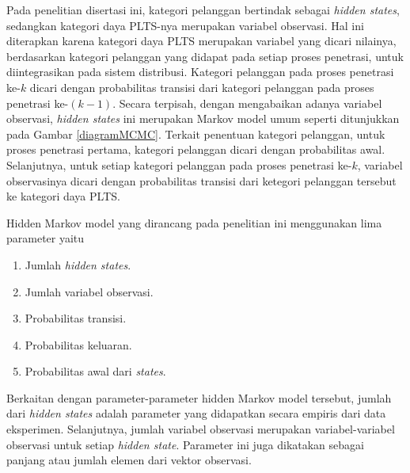 Pada penelitian disertasi ini, kategori pelanggan bertindak sebagai \textit{hidden states}, sedangkan kategori daya PLTS-nya merupakan variabel observasi. Hal ini diterapkan karena kategori daya PLTS merupakan variabel yang dicari nilainya, berdasarkan kategori pelanggan yang didapat pada setiap proses penetrasi, untuk diintegrasikan pada sistem distribusi. Kategori pelanggan pada proses penetrasi ke-$k$ dicari dengan probabilitas transisi dari kategori pelanggan pada proses penetrasi ke-$(k-1)$. Secara terpisah, dengan mengabaikan adanya variabel observasi, \textit{hidden states} ini merupakan Markov model umum seperti ditunjukkan pada Gambar \ref{diagramMCMC}. Terkait penentuan kategori pelanggan, untuk proses penetrasi pertama, kategori pelanggan dicari dengan probabilitas awal. Selanjutnya, untuk setiap kategori pelanggan pada proses penetrasi ke-$k$, variabel observasinya dicari dengan probabilitas transisi dari ketegori pelanggan tersebut ke kategori daya PLTS.

Hidden Markov model yang dirancang pada penelitian ini menggunakan lima parameter yaitu
\begin{enumerate}
	\item Jumlah \textit{hidden states}. 
	\item Jumlah variabel observasi. 
	\item Probabilitas transisi.
	\item Probabilitas keluaran.
	\item Probabilitas awal dari \textit{states}.
\end{enumerate}
Berkaitan dengan parameter-parameter hidden Markov model tersebut, jumlah dari \textit{hidden states} adalah parameter yang didapatkan secara empiris dari data eksperimen. Selanjutnya, jumlah variabel observasi merupakan variabel-variabel observasi untuk setiap \textit{hidden state}. Parameter ini juga dikatakan sebagai panjang atau jumlah elemen dari vektor observasi. 

